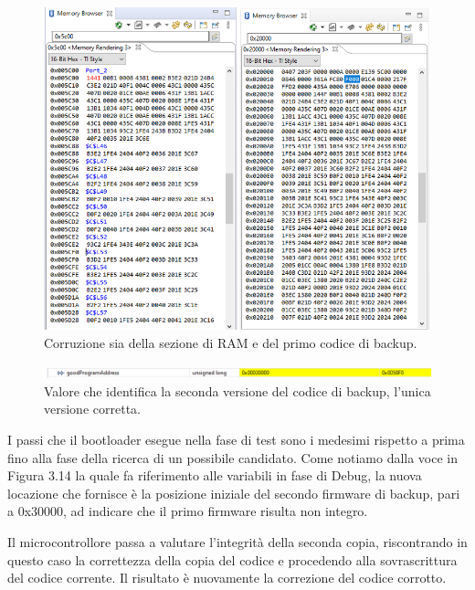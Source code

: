 \documentclass[LaM,binding=0.6cm]{../sapthesis}
\begin{document}
\begin{figure}[htbp]
\centerline{\includegraphics[scale=0.55]{examples/BootloaderTestCorruzioni2.PNG}}
\caption{Corruzione sia della sezione di RAM e del primo codice di backup.}
\label{fig}
\end{figure}
\newline



\begin{figure}[htbp]
\centerline{\includegraphics[scale=0.55]{examples/DebugBootloader.PNG}}
\caption{Valore che identifica la seconda versione del codice di backup, l'unica versione corretta.}
\label{fig}
\end{figure}
\newline

I passi che il bootloader esegue nella fase di test sono i medesimi rispetto a prima fino alla fase della ricerca di un
possibile candidato. Come notiamo dalla voce in Figura 3.14 la quale fa riferimento alle variabili in fase di Debug, la nuova locazione che fornisce è la posizione iniziale del secondo firmware di backup, pari a 0x30000, ad indicare che il primo firmware risulta non integro.

Il microcontrollore passa a valutare l'integrità della seconda copia, riscontrando in questo caso la correttezza della copia del codice e procedendo alla sovrascrittura del codice corrente. Il risultato è nuovamente la correzione del codice corrotto.
\end{document}
